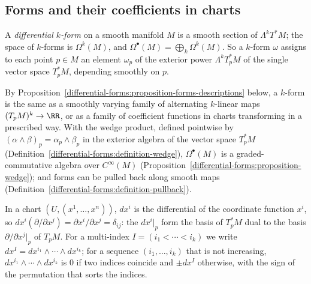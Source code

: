 \subsection{Forms and their coefficients in charts}\label{differential-forms:subsection-forms-charts}

\begin{definition}\label{differential-forms:definition-forms}
A \emph{differential $k$-form} on a smooth manifold $M$ is a smooth section of $\Lambda^kT^*M$; the space of $k$-forms is $\Omega^k(M)$, and $\Omega^\bullet(M) = \bigoplus_k\Omega^k(M)$.
So a $k$-form $\omega$ assigns to each point $p \in M$ an element $\omega_p$ of the exterior power $\Lambda^kT_p^*M$ of the single vector space $T_p^*M$, depending smoothly on $p$.
\end{definition}

By Proposition~\ref{differential-forms:proposition-forms-descriptions} below, a $k$-form is the same as a smoothly varying family of alternating $k$-linear maps
$(T_pM)^k \to \RR$, or as a family of coefficient functions in charts transforming in a prescribed way. With the wedge product, defined pointwise by $(\alpha \wedge \beta)_p = \alpha_p \wedge \beta_p$ in the exterior algebra of
the vector space $T_p^*M$ (Definition~\ref{differential-forms:definition-wedge}), $\Omega^\bullet(M)$ is a graded-commutative algebra over $C^\infty(M)$ (Proposition~\ref{differential-forms:proposition-wedge}); and forms can be pulled
back along smooth maps (Definition~\ref{differential-forms:definition-pullback}).

In a chart $(U, (x^1, \ldots, x^n))$, $dx^i$ is the differential of the coordinate function $x^i$, so $dx^i(\partial/\partial x^j) = \partial x^i/\partial x^j = \delta_{ij}$: the
$dx^i|_p$ form the basis of $T_p^*M$ dual to the basis $\partial/\partial x^j|_p$ of $T_pM$. For a multi-index $I = (i_1 < \cdots < i_k)$ we write
$dx^I = dx^{i_1} \wedge \cdots \wedge dx^{i_k}$; for a sequence $(i_1, \ldots, i_k)$ that is not increasing, $dx^{i_1} \wedge \cdots \wedge dx^{i_k}$ is $0$ if two indices coincide
and $\pm dx^I$ otherwise, with the sign of the permutation that sorts the indices.


